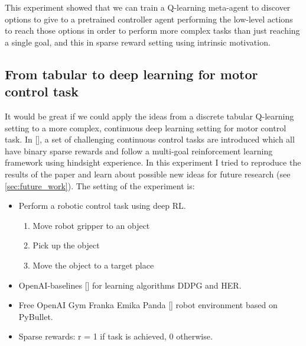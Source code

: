 \documentclass[conference]{IEEEtran}
\begin{document}
This experiment showed that we can train a Q-learning meta-agent to discover options to give to a pretrained controller agent performing the low-level actions to reach those options in order to perform more complex tasks than just reaching a single goal, and this in sparse reward setting using intrinsic motivation. 

\subsection{From tabular to deep learning for motor control task}
It would be great if we could apply the ideas from a discrete tabular Q-learning setting to a more complex, continuous deep learning setting for motor control task.  In [\cite{plappert2018multi}], a set of challenging continuous control tasks are introduced which all have binary sparse rewards and follow a multi-goal reinforcement learning framework using hindsight experience. In this experiment I tried to reproduce the results of the paper and learn about possible new ideas for future research (see \ref{sec:future_work}). The setting of the experiment is:
\begin{itemize}
    \item Perform a robotic control task using deep RL.
    \begin{enumerate}
        \item Move robot gripper to an object
        \item Pick up the object
        \item Move the object to a target place
    \end{enumerate}
    \item OpenAI-baselines [\cite{baselines}] for learning algorithms DDPG and HER.
    \item Free OpenAI Gym Franka Emika Panda [\cite{gallouedec2021multi}] robot environment based on PyBullet. 
    \item Sparse rewards: r = 1 if task is achieved, 0 otherwise.
\end{itemize}
\end{document}
